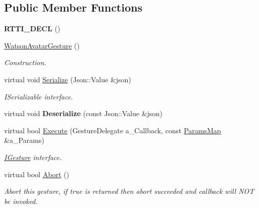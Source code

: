 \subsection*{Public Member Functions}
\begin{DoxyCompactItemize}
\item 
\mbox{\label{class_watson_avatar_gesture_aa349fa6fed0b4ba2617306b1036284ee}} 
{\bfseries R\+T\+T\+I\+\_\+\+D\+E\+CL} ()
\item 
\mbox{\label{class_watson_avatar_gesture_aadeb741d54d954e4fcd86c19addc513c}} 
\hyperlink{class_watson_avatar_gesture_aadeb741d54d954e4fcd86c19addc513c}{Watson\+Avatar\+Gesture} ()
\begin{DoxyCompactList}\small\item\em Construction. \end{DoxyCompactList}\item 
\mbox{\label{class_watson_avatar_gesture_a64754be19e9eb3f8c0057ebc08ca5c97}} 
virtual void \hyperlink{class_watson_avatar_gesture_a64754be19e9eb3f8c0057ebc08ca5c97}{Serialize} (Json\+::\+Value \&json)
\begin{DoxyCompactList}\small\item\em I\+Serializable interface. \end{DoxyCompactList}\item 
\mbox{\label{class_watson_avatar_gesture_ad26ab288d38fa0c4c37bb894acdcce69}} 
virtual void {\bfseries Deserialize} (const Json\+::\+Value \&json)
\item 
\mbox{\label{class_watson_avatar_gesture_af15fa364e5be7d7188285155035d7797}} 
virtual bool \hyperlink{class_watson_avatar_gesture_af15fa364e5be7d7188285155035d7797}{Execute} (Gesture\+Delegate a\+\_\+\+Callback, const \hyperlink{class_params_map}{Params\+Map} \&a\+\_\+\+Params)
\begin{DoxyCompactList}\small\item\em \hyperlink{class_i_gesture}{I\+Gesture} interface. \end{DoxyCompactList}\item 
\mbox{\label{class_watson_avatar_gesture_aa8e209484154c5d59865f3a873c20e11}} 
virtual bool \hyperlink{class_watson_avatar_gesture_aa8e209484154c5d59865f3a873c20e11}{Abort} ()
\begin{DoxyCompactList}\small\item\em Abort this gesture, if true is returned then abort succeeded and callback will N\+OT be invoked. \end{DoxyCompactList}\end{DoxyCompactItemize}
